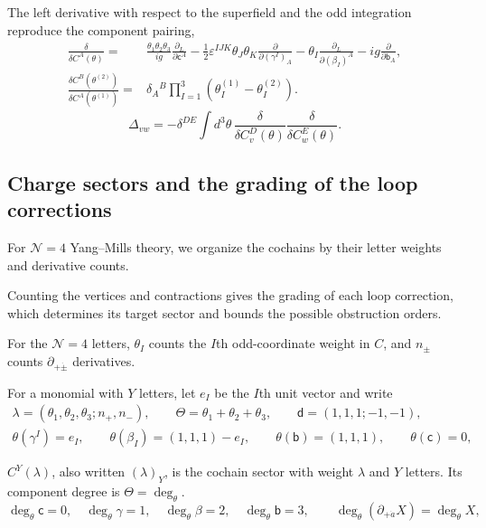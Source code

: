 \documentclass[11pt]{article}
\numberwithin{equation}{section}
\numberwithin{figure}{section}
\numberwithin{table}{section}
\begin{document}
The left derivative with respect to the superfield and the odd integration reproduce the component pairing,
\begin{equation}\label{eq-A-16}
\begin{aligned}
\frac{\delta}{\delta C^A(\theta)}
={}&\frac{\theta_1\theta_2\theta_3}{ig}
\frac{\partial_L}{\partial\mathsf c^A}
-\frac12\varepsilon^{IJK}\theta_J\theta_K
\frac{\partial}{\partial(\gamma^I)_A}
-\theta_I\frac{\partial_L}{\partial(\beta_I)^A}
-ig\frac{\partial}{\partial\mathsf b_A},\\
\frac{\delta C^B(\theta^{(2)})}{\delta C^A(\theta^{(1)})}
={}&\delta_A{}^B\prod_{I=1}^3
(\theta_I^{(1)}-\theta_I^{(2)}).
\end{aligned}
\end{equation}
\begin{equation}\label{eq-A-17}
\Delta_{vw}=-\delta^{DE}\int d^3\theta\,\frac{\delta}{\delta C_v^D(\theta)}\frac{\delta}{\delta C_w^E(\theta)} .
\end{equation}

\subsection{Charge sectors and the grading of the loop corrections}\label{sec-E-sectors}

For $\mathcal N=4$ Yang--Mills theory, we organize the cochains by their letter weights and derivative counts.

Counting the vertices and contractions gives the grading of each loop correction, which determines its target sector and bounds the possible obstruction orders.

For the $\mathcal N=4$ letters, $\theta_I$ counts the $I$th odd-coordinate weight in $C$, and $n_\pm$ counts $\partial_{+\dot\pm}$ derivatives.

For a monomial with $Y$ letters, let $e_I$ be the $I$th unit vector and write
\begin{equation}\label{eq-E-sector}
\begin{gathered}\lambda=(\theta_1,\theta_2,\theta_3;n_+,n_-),\qquad \Theta=\theta_1+\theta_2+\theta_3,\qquad \mathsf d=(1,1,1;-1,-1),\\ \theta(\gamma^I)=e_I,\qquad \theta(\beta_I)=(1,1,1)-e_I,\qquad \theta(\mathsf b)=(1,1,1),\qquad \theta(\mathsf c)=0,\end{gathered}
\end{equation}

$C^Y(\lambda)$, also written $(\lambda)_Y$, is the cochain sector with weight $\lambda$ and $Y$ letters. Its component degree is $\Theta=\deg_\theta$.
\begin{equation}\label{eq-2-62}
\deg_\theta\mathsf c=0,\quad\deg_\theta\gamma=1,\quad\deg_\theta\beta=2,\quad\deg_\theta\mathsf b=3,\qquad\deg_\theta(\partial_{+\dot a}X)=\deg_\theta X,
\end{equation}
\end{document}
